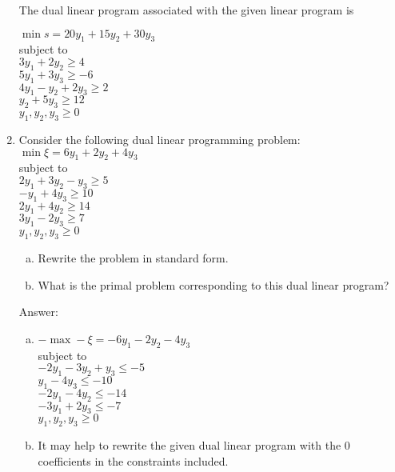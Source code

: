 \documentclass{article}
\begin{document}
\begin{enumerate}
The dual linear program associated with the given linear program is 

$\min s = 20y_1 + 15y_2 + 30y_3$ \\
subject to \\
$3y_1 + 2y_2  \geq 4$ \\
$5y_1  +3y_3 \geq -6$ \\
$4y_1 - y_2 + 2y_3 \geq 2$ \\
$y_2 + 5y_3 \geq 12$\\
$y_1,y_2,y_3 \geq 0$\\

\newpage
\item

Consider the following dual linear programming problem: \\

$\min \xi = 6y_1 + 2y_2 + 4y_3$\\
subject to\\
$2y_1 + 3y_2 -y_3 \geq 5$ \\
$-y_1 + 4y_3 \geq 10$ \\
$2y_1 + 4y_2 \geq 14$ \\
$3y_1 -2y_3 \geq 7$ \\
$y_1, y_2, y_3 \geq 0$\\

\begin{enumerate}[a)]
\item Rewrite the problem in standard form.

\item What is the primal problem corresponding to this dual linear program?
\end{enumerate}

Answer:

\begin{enumerate}[a)]
\item 

$-\max -\xi = -6y_1 - 2y_2 - 4y_3$\\
subject to\\
$-2y_1 - 3y_2 +y_3 \leq -5$ \\
$y_1 - 4y_3 \leq -10$ \\
$-2y_1 - 4y_2 \leq -14$ \\
$-3y_1 +2y_3 \leq -7$ \\
$y_1, y_2, y_3 \geq 0$\\

\item

It may help to rewrite the given dual linear program with the 0 coefficients in the constraints included.\\


\end{enumerate}
\end{enumerate}
\end{document}
